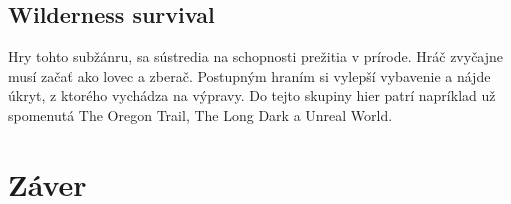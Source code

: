 \documentclass[10pt,twoside,slovak,a4paper]{article}
\begin{document}
\subsection{Wilderness survival}

Hry tohto subžánru, sa sústredia na schopnosti prežitia v prírode. Hráč zvyčajne musí začať ako lovec a zberač. Postupným hraním si vylepší vybavenie a nájde úkryt, z ktorého vychádza na výpravy. Do tejto skupiny hier patrí napríklad už spomenutá The Oregon Trail, The Long Dark a Unreal World.



\cite{Reid}








\section{Záver} \label{zaver} %




\newpage

\end{document}

